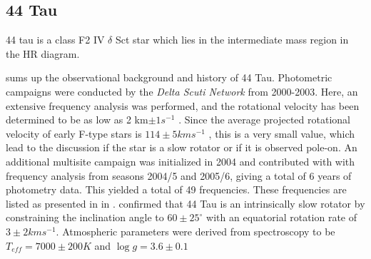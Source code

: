 \subsection{44 Tau}

44 tau is a class F2 IV $\delta$ Sct star which lies in the intermediate mass region in the HR diagram. 

\citet{antoci200744} sums up the observational background and history of 44 Tau. Photometric campaigns were conducted by the \textit{Delta Scuti Network} from 2000-2003. Here, an extensive frequency analysis was performed, and the rotational velocity has been determined to be as low as 2 km$ \pm 1 s^{-1}$ \citep{lenz2008asteroseismic}. Since the average projected rotational velocity of early F-type stars is $114 \pm 5 km s^{-1}$ \citep{royer2004rotational}, this is a very small value, which lead to the discussion if the star is a slow rotator or if it is observed pole-on\citep{antoci200744}. 
 An additional multisite campaign  was initialized in 2004 \citep{zima2007high} and \citet{breger2008A&A} contributed with with frequency analysis from seasons  2004/5 and 2005/6, giving a total of 6 years of photometry data. This yielded a total of 49 frequencies. These frequencies are listed as presented in \citep{lenz2010delta} in . \citet{zima2007high} confirmed that 44 Tau is an intrinsically slow rotator by constraining the inclination angle to $60 \pm 25^{\circ}$ with an equatorial rotation rate of $3 \pm 2 km s^{-1}$. Atmospheric parameters were derived from spectroscopy to be  $T_{eff} = 7000\pm200 K$ and $\log g = 3.6\pm0.1$

